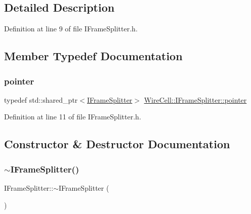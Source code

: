\subsection{Detailed Description}


Definition at line 9 of file I\+Frame\+Splitter.\+h.



\subsection{Member Typedef Documentation}
\mbox{\label{class_wire_cell_1_1_i_frame_splitter_ace5eb19c84084eb3ef737efc976edf54}} 
\subsubsection{\texorpdfstring{pointer}{pointer}}
{\footnotesize\ttfamily typedef std\+::shared\+\_\+ptr$<$\hyperlink{class_wire_cell_1_1_i_frame_splitter}{I\+Frame\+Splitter}$>$ \hyperlink{class_wire_cell_1_1_i_frame_splitter_ace5eb19c84084eb3ef737efc976edf54}{Wire\+Cell\+::\+I\+Frame\+Splitter\+::pointer}}



Definition at line 11 of file I\+Frame\+Splitter.\+h.



\subsection{Constructor \& Destructor Documentation}
\mbox{\label{class_wire_cell_1_1_i_frame_splitter_a04d06643c5f6d96b49d94fa0315c3ea9}} 
\subsubsection{\texorpdfstring{$\sim$\+I\+Frame\+Splitter()}{~IFrameSplitter()}}
{\footnotesize\ttfamily I\+Frame\+Splitter\+::$\sim$\+I\+Frame\+Splitter (\begin{DoxyParamCaption}{ }\end{DoxyParamCaption})\hspace{0.3cm}{\ttfamily [virtual]}}



